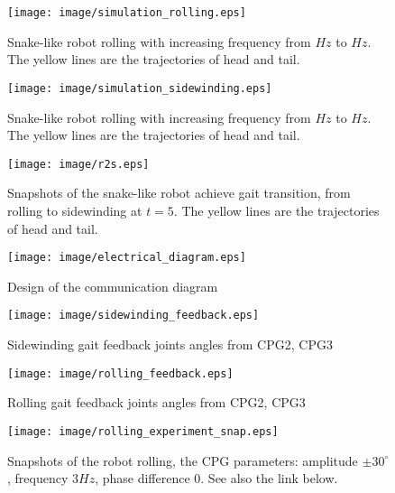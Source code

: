\documentclass[letterpaper, 10 pt, conference]{ieeeconf}
\begin{document}
\begin{figure}[thpb]
\centering
    \texttt{[image: image/simulation\_rolling.eps]}
    \caption{Snake-like robot rolling with increasing frequency from $Hz$ to $Hz$. The yellow lines are the trajectories of head and tail.}
    \label{simulation_rolling}
\end{figure}

\begin{figure}[thpb]
    \centering
    \texttt{[image: image/simulation\_sidewinding.eps]}
    \caption{Snake-like robot rolling with increasing frequency from $Hz$ to $Hz$. The yellow lines are the trajectories of head and tail.}
    \label{simulation_sidewinding}
\end{figure}

\begin{figure*}[thpb]
\centering
\texttt{[image: image/r2s.eps]}
\caption{Snapshots of the snake-like robot achieve gait transition, from rolling to sidewinding at $t=5$. The yellow lines are the trajectories of head and tail. }
\label{r2s_snap}
\end{figure*}

\begin{figure*}[thpb]
\centering
\texttt{[image: image/electrical\_diagram.eps]}
\caption{Design of the communication diagram}
\label{electrical_diagram}
\end{figure*}
\begin{figure}[thpb]
\centering
    \texttt{[image: image/sidewinding\_feedback.eps]}
    \caption{Sidewinding gait feedback joints angles from CPG2, CPG3}
    \label{sidewinding_feedback}
\end{figure}

\begin{figure}[thpb]
\centering
    \texttt{[image: image/rolling\_feedback.eps]}
    \caption{Rolling gait feedback joints angles from CPG2, CPG3}
    \label{rolling_feedback}
\end{figure}
\begin{figure*}[thpb]
\centering
\texttt{[image: image/rolling\_experiment\_snap.eps]}
\caption{Snapshots of the robot rolling, the CPG parameters: amplitude $\pm30^{\circ}$, frequency $3Hz$, phase difference $0$. See also the link below.}
\label{rolling_experiment_snap.eps}
\end{figure*}
\end{document}
